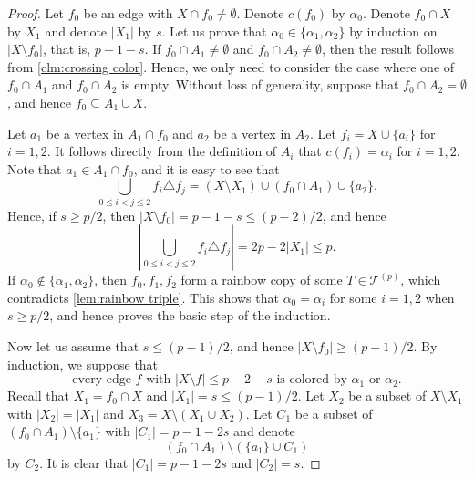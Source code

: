 \documentclass[10pt,a4paper]{article}
\theoremstyle{definition}
\newcommand{\cT}{\mathcal{T}}
\begin{document}
\begin{proof}
    Let $f_0$ be an edge with $X\cap f_0\ne\emptyset$.
    Denote $c(f_0)$ by $\alpha_0$.
    Denote $f_0\cap X$ by $X_1$ and denote $|X_1|$ by $s$.
    Let us prove that $\alpha_0\in \{\alpha_1,\alpha_2\}$ by induction on $|X\setminus f_0|$, that is, $p-1-s$.
    If $f_0\cap A_1\ne\emptyset$ and $f_0\cap A_2\ne\emptyset$, then the result follows from \cref{clm:crossing color}.
    Hence, we only need to consider the case where one of $f_0\cap A_1$ and $f_0\cap A_2$ is empty.
    Without loss of generality, suppose that $f_0\cap A_2=\emptyset$, and hence $f_0\subseteq A_1\cup X$.


    Let $a_1$ be a vertex in $A_1\cap f_0$ and $a_2$ be a vertex in $A_2$.
    Let $f_i=X\cup\{a_i\}$ for $i=1,2$.
    It follows directly from the definition of $A_i$ that $c(f_i)=\alpha_i$ for $i=1,2$.
    Note that $a_1\in A_1\cap f_0$, and it is easy to see that
    \[
        \bigcup_{0\le i<j\le 2}f_i\triangle f_j=(X\setminus X_1)\cup (f_0\cap A_1)\cup\{a_2\}.
    \]
    Hence, if $s\ge p/2$, then $|X\setminus f_0|=p-1-s\le (p-2)/2$, and hence
    \[
        \left|\bigcup_{0\le i<j\le 2}f_i\triangle f_j\right|=2p-2|X_1|\le p.
    \]
    If $\alpha_0\notin\{\alpha_1,\alpha_2\}$, then $f_0,f_1,f_2$ form a rainbow copy of some $T\in \cT^{(p)}$, which contradicts \cref{lem:rainbow triple}.
    This shows that $\alpha_0=\alpha_i$ for some $i=1,2$ when $s\ge p/2$, and hence proves the basic step of the induction.

    Now let us assume that $s\le (p-1)/2$, and hence $|X\setminus f_0|\ge (p-1)/2$.
    By induction, we suppose that
    \begin{equation}\label{equ:suppose}
        \text{every edge $f$ with $|X\setminus f|\le p-2-s$ is colored by $\alpha_1$ or $\alpha_2$.}
    \end{equation}
    Recall that $X_1=f_0\cap X$ and $|X_1|=s\le (p-1)/2$.
    Let $X_2$ be a subset of $X\setminus X_1$ with $|X_2|=|X_1|$ and $X_3=X\setminus(X_1\cup X_2)$.
    Let $C_1$ be a subset of $(f_0\cap A_1)\setminus\{a_1\}$ with $|C_1|=p-1-2s$ and denote
    \[
        (f_0\cap A_1)\setminus(\{a_1\}\cup C_1)
    \]
    by $C_2$.
    It is clear that $|C_1|=p-1-2s$ and $|C_2|=s$.


\end{proof}
\end{document}
